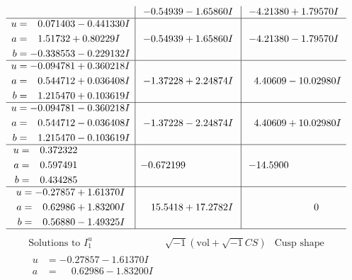 \documentclass[1p]{elsarticle_modified}
\theoremstyle{definition}
\newcommand{\I}{\sqrt{-1}}
\begin{document}
$$\begin{array}{c|c|c}
 & -0.54939 - 1.65860 I & -4.21380 + 1.79570 I \\ \hline\begin{aligned}
u &= \phantom{-}0.071403 - 0.441330 I \\
a &= \phantom{-}1.51732 + 0.80229 I \\
b &= -0.338553 - 0.229132 I\end{aligned}
 & -0.54939 + 1.65860 I & -4.21380 - 1.79570 I \\ \hline\begin{aligned}
u &= -0.094781 + 0.360218 I \\
a &= \phantom{-}0.544712 + 0.036408 I \\
b &= \phantom{-}1.215470 + 0.103619 I\end{aligned}
 & -1.37228 + 2.24874 I & \phantom{-}4.40609 - 10.02980 I \\ \hline\begin{aligned}
u &= -0.094781 - 0.360218 I \\
a &= \phantom{-}0.544712 - 0.036408 I \\
b &= \phantom{-}1.215470 - 0.103619 I\end{aligned}
 & -1.37228 - 2.24874 I & \phantom{-}4.40609 + 10.02980 I \\ \hline\begin{aligned}
u &= \phantom{-}0.372322\phantom{ +0.000000I} \\
a &= \phantom{-}0.597491\phantom{ +0.000000I} \\
b &= \phantom{-}0.434285\phantom{ +0.000000I}\end{aligned}
 & -0.672199\phantom{ +0.000000I} & -14.5900\phantom{ +0.000000I} \\ \hline\begin{aligned}
u &= -0.27857 + 1.61370 I \\
a &= \phantom{-}0.62986 + 1.83200 I \\
b &= \phantom{-}0.56880 - 1.49325 I\end{aligned}
 & \phantom{-}15.5418 + 17.2782 I & \phantom{-0.000000 } 0\\
 \hline 
 \end{array}$$\newpage$$\begin{array}{c|c|c}  
\text{Solutions to }I^u_{1}& \I (\text{vol} + \sqrt{-1}CS) & \text{Cusp shape}\\
 \hline 
\begin{aligned}
u &= -0.27857 - 1.61370 I \\
a &= \phantom{-}0.62986 - 1.83200 I \\

\end{aligned}
\end{array}$$
\end{document}
